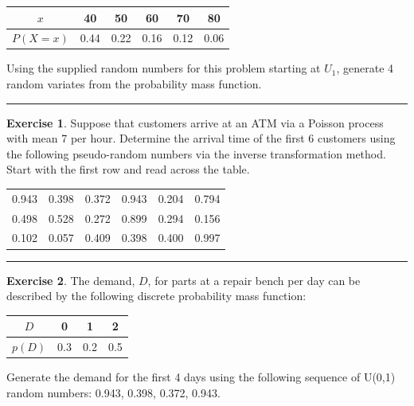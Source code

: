 \documentclass[
]{book}
\theoremstyle{definition}
\theoremstyle{definition}
\theoremstyle{definition}
\newtheorem{exercise}{Exercise}[chapter]
\theoremstyle{definition}
\theoremstyle{remark}
\begin{document}
\begin{longtable}[]{@{}cccccc@{}}
\toprule
\(x\) & 40 & 50 & 60 & 70 & 80 \\
\midrule
\endhead
\(P(X=x)\) & 0.44 & 0.22 & 0.16 & 0.12 & 0.06 \\
\bottomrule
\end{longtable}

Using the supplied random numbers for this problem starting at \(U_1\),
generate 4 random variates from the probability mass function.

\begin{center}\rule{0.5\linewidth}{0.5pt}\end{center}

\begin{exercise}
\protect\hypertarget{exr:AppRNRVP11}{}{\label{exr:AppRNRVP11} }Suppose that customers arrive at an ATM via a Poisson process with mean 7 per hour.
Determine the arrival time of the first 6 customers using the following pseudo-random numbers via the inverse transformation method. Start with the first row and read across the table.
\end{exercise}

\begin{longtable}[]{@{}cccccc@{}}
\toprule
\endhead
0.943 & 0.398 & 0.372 & 0.943 & 0.204 & 0.794 \\
0.498 & 0.528 & 0.272 & 0.899 & 0.294 & 0.156 \\
0.102 & 0.057 & 0.409 & 0.398 & 0.400 & 0.997 \\
\bottomrule
\end{longtable}

\begin{center}\rule{0.5\linewidth}{0.5pt}\end{center}

\begin{exercise}
\protect\hypertarget{exr:AppRNRVP12}{}{\label{exr:AppRNRVP12} }The demand, \(D\), for parts at a repair bench per day can be described by the following
discrete probability mass function:
\end{exercise}

\begin{longtable}[]{@{}cccc@{}}
\toprule
\(D\) & 0 & 1 & 2 \\
\midrule
\endhead
\(p(D)\) & 0.3 & 0.2 & 0.5 \\
\bottomrule
\end{longtable}

Generate the demand for the first 4 days using the following sequence of U(0,1)
random numbers: 0.943, 0.398, 0.372, 0.943.
\end{document}
